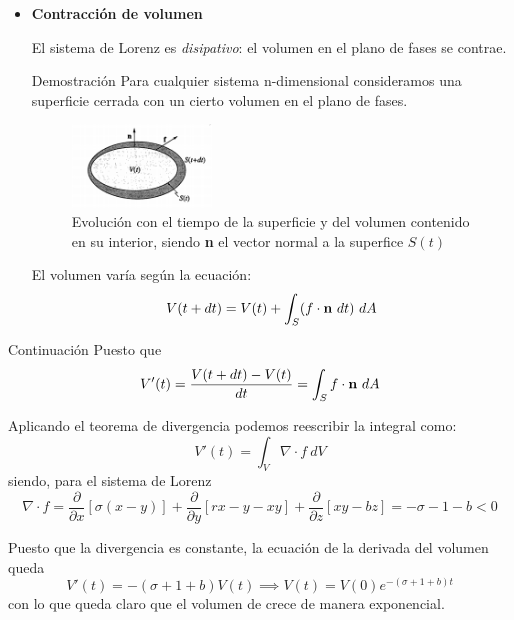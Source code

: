 \documentclass[8pt]{beamer}
\begin{document}
\begin{frame}
\begin{itemize}
\item \textbf{Contracción de volumen}

El sistema de Lorenz es \emph{disipativo}: el volumen en el plano de fases se contrae.

\begin{block}{Demostración}
Para cualquier sistema n-dimensional consideramos una superficie cerrada con un cierto volumen en el plano de fases.

\begin{figure}[hbtp]
\centering
\includegraphics[width = 0.35\textwidth]{img/volumen2D.png}
\caption{Evolución con el tiempo de la superficie y del volumen contenido en su interior, siendo \textbf{n} el vector normal a la superfice $S(t)$}
\label{fig:volumen2D}
\end{figure}

El volumen varía según la ecuación:
\[V(t+dt)=V(t) + \int_S (f\cdot \text{\textbf{n}}\ dt)\ dA\]
\end{block}
\end{itemize}
\end{frame}

\begin{frame}
\begin{block}{Continuación}
Puesto que
\[V'(t)=\frac{V(t+dt)-V(t)}{dt} = \int_S f\cdot \text{\textbf{n}}\ dA\]

Aplicando el teorema de divergencia podemos reescribir la integral como:
\[V'(t) = \int_V \nabla \cdot f \ dV \]
siendo, para el sistema de Lorenz
\[\nabla \cdot f = \frac{\partial}{\partial x}[σ(x-y)] + \frac{\partial}{\partial y}[rx-y-xy] + \frac{\partial}{\partial z}[xy-bz] = -σ-1-b < 0\]

Puesto que la divergencia es constante, la ecuación de la derivada del volumen queda
\[V'(t) = -(σ+1+b)V(t) \implies V(t) = V(0)e^{-(σ+1+b)t}\]
con lo que queda claro que el volumen de crece de manera exponencial.
\end{block}
\end{frame}
\end{document}
